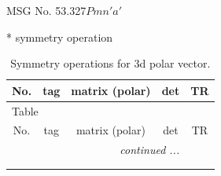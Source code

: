 \documentclass[fleqn,8pt]{jsarticle}
\begin{document}
\setcounter{MaxMatrixCols}{32}

\renewcommand{\tablename}{Table~}
\renewcommand{\figurename}{Figure~}
\begin{center}
\LARGE
MSG No. 53.327\quad$Pmn'a'$
\end{center}
* symmetry operation
\renewcommand{\arraystretch}{1.3}
\begin{longtable}{ccccc}
\caption{Symmetry operations for 3d polar vector.}
 \\
 \hline \hline
No. & tag & matrix (polar) & det & TR \\ \hline \endfirsthead

\multicolumn{4}{l}{\tablename\ \thetable{}} \\
 \hline \hline
No. & tag & matrix (polar) & det & TR \\ \hline \endhead

 \hline \hline
\multicolumn{4}{r}{\footnotesize\it continued ...} \\ \endfoot

 \hline \hline
\multicolumn{4}{r}{} \\ \endlastfoot


\end{longtable}
\end{document}
